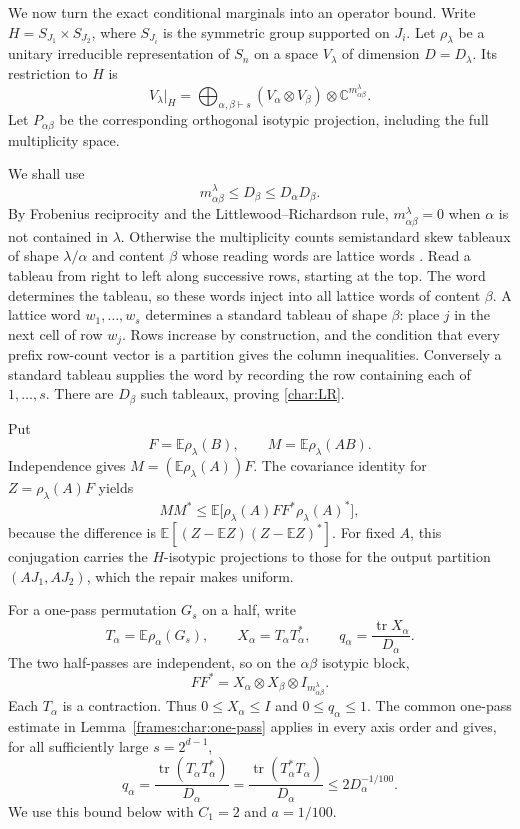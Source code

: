 We now turn the exact conditional marginals into an operator bound.
Write $H=S_{J_1}\times S_{J_2}$, where $S_{J_i}$ is the symmetric
group supported on $J_i$. Let $\rho_\lambda$ be a unitary irreducible
representation of $S_n$ on a space $V_\lambda$ of dimension
$D=D_\lambda$. Its restriction to $H$ is
\[
 V_\lambda\big|_H
 =\bigoplus_{\alpha,\beta\vdash s}
 (V_\alpha\otimes V_\beta)\otimes\mathbb C^{m_{\alpha\beta}^\lambda}.
\]
Let $P_{\alpha\beta}$ be the corresponding orthogonal isotypic
projection, including the full multiplicity space.

We shall use
\begin{equation}\label{char:LR}
 m_{\alpha\beta}^\lambda\le D_\beta\le D_\alpha D_\beta.
\end{equation}
By Frobenius reciprocity \cite[Theorem~4.33]{etingof} and the
Littlewood--Richardson rule,
$m_{\alpha\beta}^\lambda=0$ when $\alpha$ is not contained in
$\lambda$. Otherwise the multiplicity counts semistandard skew tableaux
of shape $\lambda/\alpha$ and content $\beta$ whose reading words are
lattice words
\cite[Definitions~15.2, 15.6 and~16.1; Theorem~16.4]{James1978}.
Read a tableau from right to left along successive rows, starting at
the top. The word determines the tableau, so these words inject into
all lattice words of content
$\beta$. A lattice word $w_1,\ldots,w_s$ determines a standard tableau
of shape $\beta$: place $j$ in the next cell of row $w_j$. Rows increase
by construction, and the condition that every prefix row-count vector
is a partition gives the column inequalities. Conversely a standard
tableau supplies the word by recording the row containing each of
$1,\ldots,s$. There are $D_\beta$ such tableaux, proving
\eqref{char:LR}.

Put
\[
 F=\mathbb E\rho_\lambda(B),\qquad
 M=\mathbb E\rho_\lambda(AB).
\]
Independence gives $M=(\mathbb E\rho_\lambda(A))F$. The covariance
identity for $Z=\rho_\lambda(A)F$ yields
\begin{equation}\label{char:psd}
 MM^*\le
 \mathbb E\bigl[\rho_\lambda(A)FF^*\rho_\lambda(A)^*\bigr],
\end{equation}
because the difference is
$\mathbb E[(Z-\mathbb EZ)(Z-\mathbb EZ)^*]$.
For fixed $A$, this conjugation carries the $H$-isotypic projections
to those for the output partition $(AJ_1,AJ_2)$, which the repair
makes uniform.

For a one-pass permutation $G_s$ on a half, write
\[
 T_\alpha=\mathbb E\rho_\alpha(G_s),\qquad
 X_\alpha=T_\alpha T_\alpha^*,\qquad
 q_\alpha=\frac{\operatorname{tr}X_\alpha}{D_\alpha}.
\]
The two half-passes are independent, so on the $\alpha\beta$ isotypic
block,
\[
 FF^*=X_\alpha\otimes X_\beta\otimes
 I_{m_{\alpha\beta}^\lambda}.
\]
Each $T_\alpha$ is a contraction. Thus $0\le X_\alpha\le I$ and
$0\le q_\alpha\le1$. The common one-pass estimate in
Lemma~\ref{frames:char:one-pass} applies in every axis order and gives,
for all sufficiently large $s=2^{d-1}$,
\begin{equation}\label{char:shared-sweep-bound}
 q_\alpha
 =\frac{\operatorname{tr}(T_\alpha T_\alpha^*)}{D_\alpha}
 =\frac{\operatorname{tr}(T_\alpha^*T_\alpha)}{D_\alpha}
 \le 2D_\alpha^{-1/100}.
\end{equation}
We use this bound below with $C_1=2$ and $a=1/100$.

